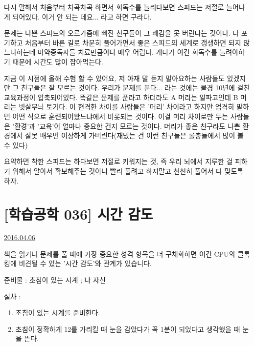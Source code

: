 다시 말해서 처음부터 차곡차곡 하면서 회독수를 늘리다보면 스피드는 저절로 늘어나게 되어있다.
이거 안 되는 데요... 라고 하면 구라다.
\vspace{5mm}

문제는 나쁜 스피드의 오르가즘에 빠진 친구들이 그 쾌감을 못 버린다는 것이다.
다 포기하고 처음부터 바른 길로 차분히 풀어가면서 좋은 스피드의 세계로 갱생하면 되지 않느냐하는데
마약중독자들 치료만큼이나 매우 어렵다.
게다가 이건 회독수를 늘려야하기 때문에 시간도 많이 잡아먹는다.
\vspace{5mm}

지금 이 시점에 올해 수험 할 수 있어요, 저 아재 말 듣지 말아요하는 사람들도 있겠지만 그 친구들은 잘 모르는 것이다.
우리가 문제를 푼다... 라는 것에는 물경 10년에 걸친 교육과정이 압축되어있다.
똑같은 문제를 푼라고 하더라도 A 머리는 알파고인데 B 머리는 빗살무늬 토기다.
이 현격한 차이를 사람들은 '머리' 차이라고 하지만 엄격히 말하면 어떤 식으로 훈련되어왔느냐에서 비롯되는 것이다.
이걸 머리 차이로만 두는 사람들은 '환경'과 '교육'이 얼마나 중요한 건지 모르는 것이다.
머리가 좋은 친구라도 나쁜 환경에서 잘못 배우면 이상하게 가버린다(재밌는 건 이런 친구들은 롤충들에서 많이 볼 수 있다)
\vspace{5mm}

요약하면 착한 스피드는 하다보면 저절로 키워지는 것, 즉 우리 뇌에서 지루한 걸 피하기 위해서 알아서 확보해주는 것이니
빨리 풀려고 하지말고 천천히 풀어서 다 맞도록 하자.
\vspace{5mm}







\section{[학습공학 036] 시간 감도}
\href{https://www.kockoc.com/Apoc/714448}{2016.04.06}

\vspace{5mm}

책을 읽거나 문제를 풀 때에 가장 중요한 성격 항목을 더 구체화하면
이건 CPU의 클록킹에 비견될 수 있는 '시간 감도'와 관계가 있습니다.
\vspace{5mm}

준비물 : 초침이 있는 시계 ; 나 자신
\vspace{5mm}

절차 :
\vspace{5mm}
\begin{enumerate}
    \item 초침이 있는 시계를 준비한다.
    \item 초침이 정확하게 12를 가리킬 때 눈을 감았다가 꼭 1분이 되었다고 생각했을 때 눈을 뜬다.
\end{enumerate}
\vspace{5mm}

